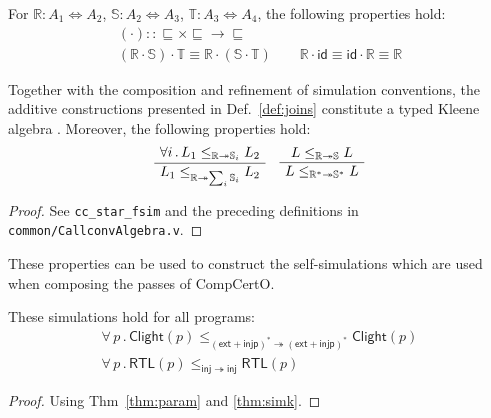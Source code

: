 \documentclass[acmsmall,authordraft]{acmart}
\newcommand{\kw}[1]{\ensuremath{ \mathsf{#1} }}
\newcommand{\scref}{\sqsubseteq}
\begin{document}
\begin{theorem} %
For
$\mathbb{R} : A_1 \Leftrightarrow A_2$,
$\mathbb{S} : A_2 \Leftrightarrow A_3$,
$\mathbb{T} : A_3 \Leftrightarrow A_4$,
the following properties hold:
\begin{gather*}
  ({\cdot}) :: {{\scref} \times {\scref} \rightarrow {\scref}}
  \\
  (\mathbb{R} \cdot \mathbb{S}) \cdot \mathbb{T} \equiv
    \mathbb{R} \cdot (\mathbb{S} \cdot \mathbb{T})
  \qquad
  \mathbb{R} \cdot \kw{id} \equiv
  \kw{id} \cdot \mathbb{R} \equiv
  \mathbb{R}
\end{gather*}
\end{theorem}

\begin{theorem} \label{thm:simk} %
Together with the composition and refinement of simulation conventions,
the additive constructions presented in Def.~\ref{def:joins}
constitute a typed Kleene algebra \cite{tka}.
Moreover, the following properties hold:
\[
  \AxiomC{$\forall i \,.\,
    L_1 \le_{\mathbb{R} \twoheadrightarrow \mathbb{S}_i} L_2$}
  \UnaryInfC{$
    L_1 \le_{\mathbb{R} \twoheadrightarrow \sum_i \mathbb{S}_i} L_2$}
  \DisplayProof
  \quad
  \AxiomC{$L \le_{\mathbb{R} \twoheadrightarrow \mathbb{S}} L$}
  \UnaryInfC{$L \le_{\mathbb{R}^* \twoheadrightarrow \mathbb{S}^*} L$}
  \DisplayProof
\]
\begin{proof}
See \texttt{cc\_star\_fsim} and the preceding definitions
in \texttt{common/CallconvAlgebra.v}.
\end{proof}
\end{theorem}

These properties can be used to construct
the self-simulations which are used
when composing the passes of CompCertO.

\begin{theorem} \label{thm:lprops} %
These simulations hold
for all programs:
\begin{gather*}
\forall \, p \,.\,
  \kw{Clight}(p)
  \le_{(\kw{ext} + \kw{injp})^* \twoheadrightarrow (\kw{ext} + \kw{injp})^*}
  \kw{Clight}(p) \\
\forall \, p \,.\,
  \kw{RTL}(p)
  \le_{\kw{inj} \twoheadrightarrow \kw{inj}}
  \kw{RTL}(p)
\end{gather*}
\begin{proof}
Using Thm~\ref{thm:param} and \ref{thm:simk}.
\end{proof}
\end{theorem}
\end{document}
